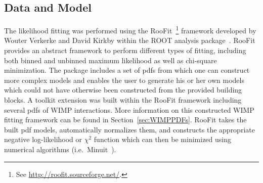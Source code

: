 	\subsection{Data and Model}
	\label{sec:LimitsDataAndModel}	

The likelihood fitting was performed using the RooFit~\footnote{See \url{http://roofit.sourceforge.net/}.} framework developed by Wouter Verkerke and David Kirkby within the ROOT analysis package~\cite{Bru97}.  RooFit provides an abstract framework to perform different types of fitting, including both binned and unbinned maximum likelihood as well as chi-square minimization.  The package includes a set of pdfs from which one can construct more complex models and enables the user to generate his or her own models which could not have otherwise been constructed from the provided building blocks.  A toolkit extension was built within the RooFit framework including several pdfs of WIMP interactions.  More information on this constructed WIMP fitting framework can be found in Section~\ref{sec:WIMPPDFs}.  RooFit takes the built pdf models, automatically normalizes them, and constructs the appropriate negative log-likelihood or $\chi^{2}$ function which can then be minimized using numerical algorithms (i.e.~Minuit~\cite{James:1975dr}).



